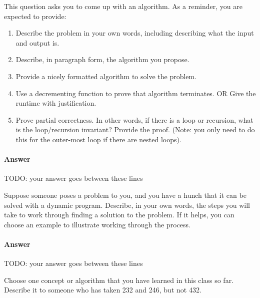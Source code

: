 \documentclass{article}
\begin{document}
This question asks you to come up with an algorithm.  As a reminder, you are
expected to provide:
\begin{enumerate}
    \item Describe the problem in your own words, including
        describing what the input and output is.
    \item Describe, in paragraph form, the algorithm you propose.
    \item Provide a nicely formatted algorithm to solve the problem.
    \item Use a decrementing function to prove that algorithm terminates.
            OR  Give the runtime with justification.
    \item Prove partial correctness.  In other words, if there is a loop or
        recursion, what is the loop/recursion invariant? Provide the proof.
        (Note: you only need to do this for the outer-most loop if there are
        nested loops).
\end{enumerate}



\paragraph{Answer}

TODO: your answer goes between these lines


\nextprob
{}

Suppose someone poses a problem to you, and you have a hunch that it can be
solved with a dynamic program.  Describe, in your own words, the steps you will
take to work through finding a solution to the problem.  If it helps, you can
choose an example to illustrate working through the process.

\paragraph{Answer}


TODO: your answer goes between these lines




\nextprob
{}

Choose one concept or algorithm that you have learned
in this class so far. Describe it to someone who has
taken 232 and 246, but not 432.
\end{document}

